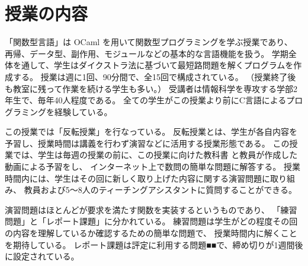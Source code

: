 \section{授業の内容}
\label{section:experiment__course}
「関数型言語」は OCaml を用いて関数型プログラミングを学ぶ授業であり、
再帰、データ型、副作用、モジュールなどの基本的な言語機能を扱う。
学期全体を通して、学生はダイクストラ法に基づいて最短路問題を解くプログラムを作成する。
授業は週に1回、90分間で、全15回で構成されている。
（授業終了後も教室に残って作業を続ける学生も多い。）
受講者は情報科学を専攻する学部2年生で、毎年40人程度である。
全ての学生がこの授業より前にC言語によるプログラミングを経験している。

この授業では「反転授業」を行なっている。
反転授業とは、学生が各自内容を予習し、授業時間は講義を行わず演習などに活用する授業形態である。
この授業では、学生は毎週の授業の前に、この授業に向けた教科書 \cite{Asai07} と教員が作成した動画による予習をし、
インターネット上で数問の簡単な問題に解答する。
授業時間内には、学生はその回に新しく取り上げた内容に関する演習問題に取り組み、
教員および5〜8人のティーチングアシスタントに質問することができる。

演習問題はほとんどが要求を満たす関数を実装するというものであり、
「練習問題」と「レポート課題」に分かれている。
練習問題は学生がどの程度その回の内容を理解しているか確認するための簡単な問題で、
授業時間内に解くことを期待している。
レポート課題は評定に利用する問題■■で、締め切りが1週間後に設定されている。

